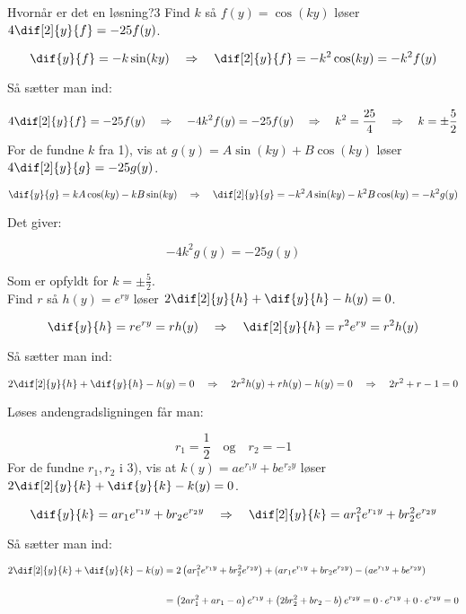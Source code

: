 \begin{opgave}{Hvornår er det en løsning?}{3}
\opg Find $k$ så $f(y) = \cos(ky)$ løser $4 \dif[2]{y}{f} = -25f(y)$.

$$\dif{y}{f} = -k\sin(ky) \quad \Rightarrow \quad \dif[2]{y}{f} = -k^2 \cos(ky) = -k^2 f(y)$$

\vspace{2mm}

Så sætter man ind:

$$4 \dif[2]{y}{f} = -25f(y) \quad \Rightarrow \quad -4k^2 f(y) = -25f(y) \quad \Rightarrow \quad k^2 = \frac{25}{4} \quad \Rightarrow \quad k = \pm \frac{5}{2}$$
\vspace{2mm}
\opg For de fundne $k$ fra 1), vis at $g(y) = A\sin(ky) + B\cos(ky)$ løser $4 \dif[2]{y}{g} = -25g(y)$.

$$\dif{y}{g} = kA\cos(ky) - kB\sin(ky) \quad \Rightarrow \quad \dif[2]{y}{g} = -k^2 A \sin(ky) - k^2 B \cos(ky) = -k^2g(y)$$

\vspace{2mm}

Det giver:

$$-4k^2 g(y) = -25g(y) $$

\vspace{2mm}

Som er opfyldt for $k = \pm \frac{5}{2}$.\\
\opg Find $r$ så $h(y) = e^{ry}$ løser $2 \dif[2]{y}{h} + \dif{y}{h} - h(y) = 0$.

$$\dif{y}{h} = re^{ry} = rh(y) \quad \Rightarrow \quad \dif[2]{y}{h} = r^2 e^{ry} = r^2 h(y)$$

\vspace{2mm}

Så sætter man ind:

$$2 \dif[2]{y}{h} + \dif{y}{h} - h(y) = 0 \quad \Rightarrow \quad 2r^2h(y) + rh(y) -h(y) = 0 \quad \Rightarrow \quad 2r^2+r-1=0$$
\vspace{2mm}

Løses andengradsligningen får man:

$$r_1 = \frac{1}{2} \quad \text{og} \quad r_2 = -1$$ 
\vspace{2mm}
\opg For de fundne $r_1,r_2$ i 3), vis at $k(y) = ae^{r_1y} + be^{r_2y}$ løser $2 \dif[2]{y}{k} + \dif{y}{k} - k(y) = 0$.

$$\dif{y}{k} = ar_1e^{r_1y} + br_2e^{r_2y} \quad \Rightarrow \quad \dif[2]{y}{k} = ar_1^2e^{r_1y} + br_2^2e^{r_2y}$$ 
\vspace{2mm}

Så sætter man ind:

\begin{align*}
2 \dif[2]{y}{k} + \dif{y}{k} - k(y) &= 2 \left( ar_1^2e^{r_1y} + br_2^2e^{r_2y}  \right) + \left( ar_1e^{r_1y} + br_2e^{r_2y} \right) - \left( ae^{r_1y} + be^{r_2y} \right)\\\\ 
&= \left( 2ar_1^2 + ar_1 - a \right)e^{r_1y} + \left( 2br_2^2 + br_2 - b \right)e^{r_2y} = 0 \cdot e^{r_1y} + 0 \cdot e^{r_2y} = 0 
\end{align*}
\end{opgave}